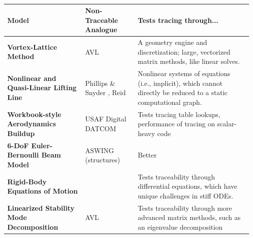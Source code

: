 \documentclass[12pt,vi,oneside]{report}
\begin{document}
    \begin{table}[H]

        \centering
        \caption{}
        \label{tab:}

        \begin{adjustbox}{width=\textwidth}

            \begin{tabularx}{1.2\textwidth}{M E D}
                \toprule
                \textbf{Model}                                   & \textbf{Non-Traceable Analogue}                                     & \textbf{Tests tracing through...}                                                                                  \\ \toprule
                \textbf{Vortex-Lattice Method}                   & AVL \cite{avl}                                                      & A geometry engine and discretization; large, vectorized matrix methods, like linear solves.                        \\ \midrule
                \textbf{Nonlinear and Quasi-Linear Lifting Line} & Phillips \& Snyder \cite{phillips_modern_2000}, Reid \cite{reid_general_2020}       & Nonlinear systems of equations (i.e., implicit), which cannot directly be reduced to a static computational graph. \\ \midrule
                \textbf{Workbook-style Aerodynamics Buildup}     & USAF Digital DATCOM \cite{datcom}                                   & Tests tracing table lookups, performance of tracing on scalar-heavy code                                           \\ \midrule
                \textbf{6-DoF Euler-Bernoulli Beam Model}        & ASWING (structures) \cite{aswing}                                   & Better                                                                                                             \\ \midrule
                \textbf{Rigid-Body Equations of Motion}          &                                                                     & Tests traceability through differential equations, which have unique challenges in stiff ODEs.                     \\ \midrule
                \textbf{Linearized Stability Mode Decomposition} & AVL \cite{avl}                                                      & Tests traceability through more advanced matrix methods, such as an eigenvalue decomposition                       \\
                \bottomrule
            \end{tabularx}

        \end{adjustbox}
    \end{table}
\end{document}
